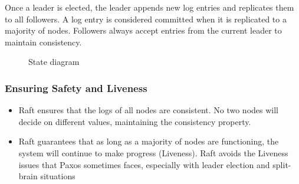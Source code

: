 Once a leader is elected, the leader appends new log entries and replicates them to all followers.
A log entry is considered committed when it is replicated to a majority of nodes. Followers always accept entries from the current leader to maintain consistency.

\begin{figure}[htbp]
   \centering
   \caption{State diagram}
   \label{fig:state_diagram}
\end{figure}

\subsubsection{Ensuring Safety and Liveness}
   {
    \begin{itemize}
    	\item Raft ensures that the logs of all nodes are consistent. No two nodes will decide on different values, maintaining the consistency property.
    \end{itemize}
   }
   {
    \begin{itemize}
    	\item Raft guarantees that as long as a majority of nodes are functioning, the system will continue to make progress (Liveness). Raft avoids the Liveness issues that Paxos sometimes faces, especially with leader election and split-brain situations
    \end{itemize}
   }

